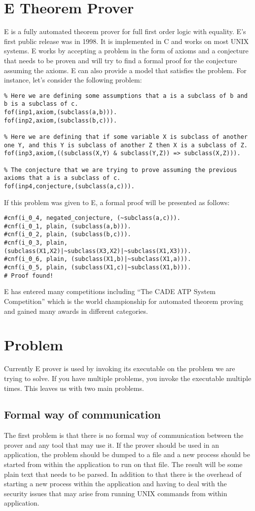 \section{E Theorem Prover}\label{sec:eprover}
E is a fully automated theorem prover for full first order logic with equality. E's first public release was in 1998. It is implemented in C and works on most UNIX systems. E works by accepting a problem in the form of axioms and a conjecture that needs to be proven and will try to find a formal proof for the conjecture assuming the axioms. E can also provide a model that satisfies the problem. For instance, let's consider the following problem:
\begin{lstlisting}
% Here we are defining some assumptions that a is a subclass of b and b is a subclass of c.
fof(inp1,axiom,(subclass(a,b))).
fof(inp2,axiom,(subclass(b,c))).

% Here we are defining that if some variable X is subclass of another one Y, and this Y is subclass of another Z then X is a subclass of Z.
fof(inp3,axiom,((subclass(X,Y) & subclass(Y,Z)) => subclass(X,Z))).

% The conjecture that we are trying to prove assuming the previous axioms that a is a subclass of c.
fof(inp4,conjecture,(subclass(a,c))).
\end{lstlisting}
If this problem was given to E, a formal proof will be presented as follows:
\begin{lstlisting}
#cnf(i_0_4, negated_conjecture, (~subclass(a,c))).
#cnf(i_0_1, plain, (subclass(a,b))).
#cnf(i_0_2, plain, (subclass(b,c))).
#cnf(i_0_3, plain, (subclass(X1,X2)|~subclass(X3,X2)|~subclass(X1,X3))).
#cnf(i_0_6, plain, (subclass(X1,b)|~subclass(X1,a))).
#cnf(i_0_5, plain, (subclass(X1,c)|~subclass(X1,b))).
# Proof found!
\end{lstlisting}
E has entered many competitions including ``The CADE ATP System Competition'' which is the world championship for automated theorem proving and gained many awards in different categories.

\section{Problem}
Currently E prover is used by invoking its executable on the problem we are trying to solve. If you have multiple problems, you invoke the executable multiple times. This leaves us with two main problems.

\subsection{Formal way of communication}
The first problem is that there is no formal way of communication between the prover and any tool that may use it. If the prover should be used in an application, the problem should be dumped to a file and a new process should be started from within the application to run on that file. The result will be some plain text that needs to be parsed. In addition to that there is the overhead of starting a new process within the application and having to deal with the security issues that may arise from running UNIX commands from within application.

